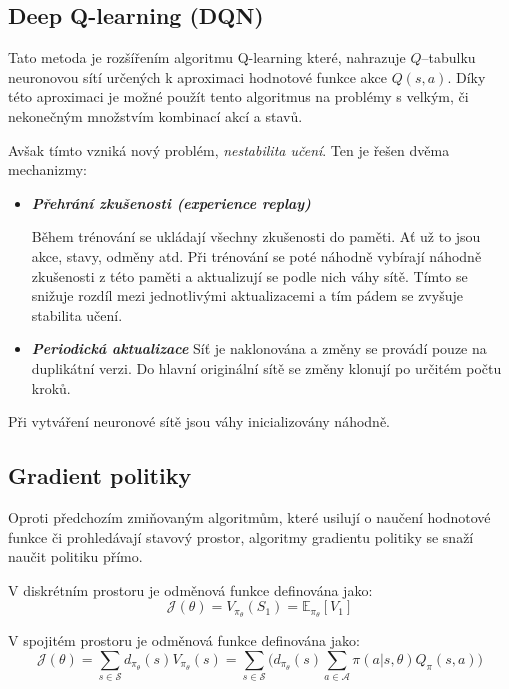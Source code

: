 \subsection{Deep Q-learning (DQN)}\label{subsec:deep-q-learning}

Tato metoda je rozšířením algoritmu Q-learning které,
nahrazuje $Q$--tabulku neuronovou sítí určených k aproximaci hodnotové funkce akce $Q(s, a)$.
Díky této aproximaci je možné použít tento algoritmus na problémy s velkým, či nekonečným množstvím kombinací akcí a stavů.

Avšak tímto vzniká nový problém, \emph{nestabilita učení}.
Ten je řešen dvěma mechanizmy:

\begin{itemize}
  \item \textbf{\emph{Přehrání zkušenosti (experience replay)}}
  
  Během trénování se ukládají všechny zkušenosti do paměti.
  Ať už to jsou akce, stavy, odměny atd.
  Při trénování se poté náhodně vybírají náhodně zkušenosti z této paměti a aktualizují se podle nich váhy sítě.
  Tímto se snižuje rozdíl mezi jednotlivými aktualizacemi a tím pádem se zvyšuje stabilita učení.
  

  \item \textbf{\emph{Periodická aktualizace}}
  Síť je naklonována a změny se provádí pouze na duplikátní verzi.
  Do hlavní originální sítě se změny klonují po určitém počtu kroků.

\end{itemize}

Při vytváření neuronové sítě jsou váhy inicializovány náhodně.

\subsection{Gradient politiky}\label{subsec:gradient-politiky}
Oproti předchozím zmiňovaným algoritmům, které usilují o naučení hodnotové funkce či prohledávají stavový prostor, algoritmy gradientu politiky se snaží naučit politiku přímo.

V diskrétním prostoru je odměnová funkce definována jako:
\begin{equation}
  \label{eq:odmenova_funkce}
  \mathcal{J}(\theta) = V_{\pi_\theta}(S_1) = \mathbb{E}_{\pi_\theta}[V_1]
\end{equation}

V spojitém prostoru je odměnová funkce definována jako:
\begin{equation}
    \label{eq:odmenova_funkce_spojita}
  \mathcal{J}(\theta) = \sum_{s \in \mathcal{S}} d_{\pi_\theta}(s) V_{\pi_\theta}(s) = \sum_{s \in \mathcal{S}} \Big( d_{\pi_\theta}(s) \sum_{a \in \mathcal{A}} \pi(a \vert s, \theta) Q_\pi(s, a) \Big)
  \end{equation}

